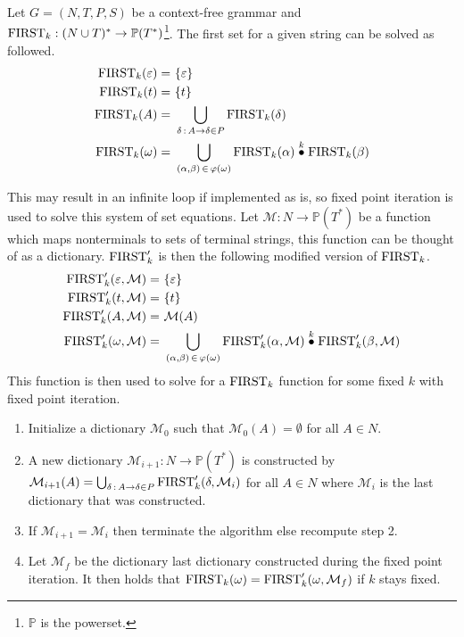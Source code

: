\begin{algorithm}
    \label{algorithm:first}
    Let $G = (N, T, P, S)$ be a context-free grammar and $\text{FIRST}_k: (N \cup T)^* \to \mathbb{P}(T^*)$\footnote{$\mathbb{P}$ is the powerset.}. The first set for a given string can be solved as followed.
    \begin{align*}
        \FIRST_k(\varepsilon) =&\,\, \{\varepsilon\} \\
        \FIRST_k(t) =&\,\, \{t\} \\
        \FIRST_k(A) =&\,\, \bigcup_{\delta \, : \, A \to \delta \in P} \FIRST_k(\delta) \\
        \FIRST_k(\omega) =&\,\, \bigcup_{(\alpha, \beta) \, \in \, \varphi(\omega)} \FIRST_k(\alpha) \truncprod{k} \FIRST_k(\beta)
    \end{align*}
\end{algorithm}
\noindent This may result in an infinite loop if implemented as is, so fixed point iteration is used to solve this system of set equations. Let $\mathcal{M}: N \to \mathbb{P}(T^*)$ be a function which maps nonterminals to sets of terminal strings, this function can be thought of as a dictionary. $\text{FIRST}'_k$ is then the following modified version of $\text{FIRST}_k$.
\begin{align*}
    \FIRST'_k(\varepsilon, \mathcal{M}) =&\,\, \{\varepsilon\} \\
    \FIRST'_k(t, \mathcal{M}) =&\,\, \{t\} \\
    \FIRST'_k(A, \mathcal{M}) =&\,\, \mathcal{M}(A) \\
    \FIRST'_k(\omega, \mathcal{M}) =&\,\, \bigcup_{(\alpha, \beta) \, \in \, \varphi(\omega)} \FIRST'_k(\alpha, \mathcal{M}) \truncprod{k} \FIRST'_k(\beta, \mathcal{M})
\end{align*}
This function is then used to solve for a $\text{FIRST}_k$ function for some fixed $k$ with fixed point iteration.
\begin{enumerate}
    \item Initialize a dictionary $\mathcal{M}_0$ such that $\mathcal{M}_0(A) = \emptyset$ for all $A \in N$.
    \item A new dictionary $\mathcal{M}_{i+1}: N \to \mathbb{P}(T^*)$ is constructed by $\mathcal{M}_{i+1}(A) = \bigcup_{\delta \, : \, A \to \delta \in P} \text{FIRST}'_k(\delta, \mathcal{M}_{i})$ for all $A \in N$ where $\mathcal{M}_{i}$ is the last dictionary that was constructed.
    \item If $\mathcal{M}_{i + 1} = \mathcal{M}_{i}$ then terminate the algorithm else recompute step 2.
    \item Let $\mathcal{M}_f$ be the dictionary last dictionary constructed during the fixed point iteration. It then holds that $\text{FIRST}_k(\omega) = \text{FIRST}'_k(\omega, \mathcal{M}_f)$ if $k$ stays fixed.
\end{enumerate}
